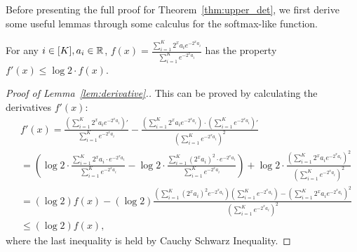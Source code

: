 Before presenting the full proof for Theorem~\ref{thm:upper_det}, we first derive some useful lemmas through some calculus for the softmax-like function.
\begin{lemma}
\label{lem:derivative}
	For any $i\in [K], a_i\in \mathbb{R}$, $f(x) = \frac{\sum_{i=1}^K 2^xa_i e^{- 2^xa_i}}{\sum_{i=1}^K e^{-2^xa_i}}$ has the property $f'(x)\leq \log 2\cdot f(x)$.
\end{lemma}
\begin{proof}[Proof of Lemma~\ref{lem:derivative}.]
This can be proved by calculating the derivatives $f'(x)$:
\begin{align*}
		&f'(x) = \frac{\left(\sum_{i=1}^K 2^xa_i e^{- 2^xa_i}\right)'}{\sum_{i=1}^K e^{-2^xa_i}} - \frac{\left(\sum_{i=1}^K 2^xa_i e^{- 2^xa_i}\right)\cdot \left(\sum_{i=1}^K e^{-2^xa_i}\right)'}{\left(\sum_{i=1}^K e^{-2^xa_i}\right)^2}\\
		& = \left(\log 2\cdot \frac{\sum_{i=1}^K 2^xa_i\cdot e^{-2^xa_i } }{\sum_{i=1}^K e^{-2^xa_i }} -\log2 \cdot\frac{\sum_{i=1}^K \left(2^xa_i\right)^2\cdot e^{-2^xa_i }  }{\sum_{i=1}^K e^{-2^xa_i }}\right) + \log 2 \cdot \frac{ (\sum_{i=1}^K 2^xa_i e^{-2^xa_i})^2}{(\sum_{i=1}^K e^{-2^xa_i})^2}\\
		& = (\log 2) f(x) - (\log 2)\frac{ (\sum_{i=1}^K (2^xa_i)^2e^{-2^xa_i})(\sum_{i=1}^K e^{-2^xa_i}) -(\sum_{i=1}^K 2^xa_i e^{-2^xa_i})^2}{(\sum_{i=1}^K e^{-2^xa_i})^2}\\
		&\leq (\log 2) f(x),
	\end{align*}
        where the last inequality is held by Cauchy Schwarz Inequality.	
\end{proof}

